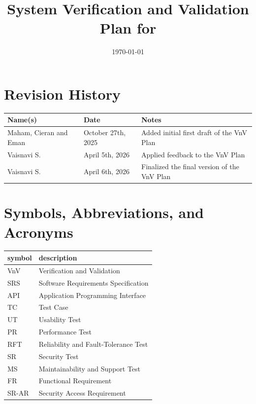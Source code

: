 \documentclass[12pt, titlepage]{article}
\begin{document}
\title{System Verification and Validation Plan for \progname{}} 
\author{\authname}
\date{\today}
	
\maketitle


\section*{Revision History}

\begin{tabularx}{\textwidth}{p{3cm}p{2cm}X}
\toprule {\bf Name(s)} & {\bf Date} & {\bf Notes}\\
\midrule
Maham, Cieran and Eman & October 27th, 2025 & Added initial first draft of the VnV Plan\\
Vaisnavi S. & April 5th, 2026 & Applied feedback to the VnV Plan\\
Vaisnavi S. & April 6th, 2026 & Finalized the final version of the VnV Plan\\
\bottomrule
\end{tabularx}



\newpage

\tableofcontents

\listoftables

\newpage

\section{Symbols, Abbreviations, and Acronyms}

\renewcommand{\arraystretch}{1.2}
\begin{tabular}{l l} 
  \toprule		
  \textbf{symbol} & \textbf{description}\\
  \midrule 
  VnV & Verification and Validation\\
  SRS & Software Requirements Specification\\
  API & Application Programming Interface\\
  TC & Test Case\\
  UT & Usability Test\\
  PR & Performance Test\\
  RFT & Reliability and Fault-Tolerance Test\\
  SR & Security Test\\
  MS & Maintainability and Support Test\\
  FR & Functional Requirement\\
  SR-AR & Security Access Requirement\\
  \bottomrule
\end{tabular}\\
\end{document}

